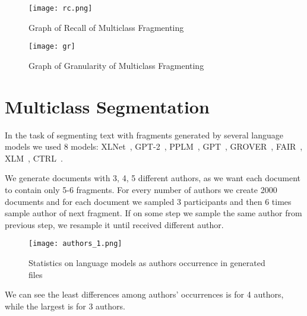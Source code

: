 \documentclass{article}
\begin{document}
\begin{figure}[bhtp]
	\texttt{[image: rc.png]}
	\caption{Graph of Recall of Multiclass Fragmenting}
	\label{fig:4}
\end{figure}

\begin{figure}[bhtp]
	\texttt{[image: gr]}
	\caption{Graph of Granularity of Multiclass Fragmenting}
	\label{fig:5}
\end{figure}




\clearpage



\newpage
\appendix
\section{Multiclass Segmentation}

In the task of segmenting text with fragments generated by several language models we used 8 models: XLNet~\cite{xlnet}, GPT-2~\cite{gpt2}, PPLM~\cite{pplm}, GPT~\cite{gpt}, GROVER~\cite{grover}, FAIR~\cite{FAIR}, XLM~\cite{xlm}, CTRL~\cite{ctrl}.

We generate  documents with 3, 4, 5 different authors, as we want each document to contain only 5-6 fragments. For every number of authors we create 2000 documents and for each document we sampled 3 participants and then 6 times sample author of next fragment. If on some step we sample the same author from previous step, we resample it until received different author. 

\begin{figure}[bhtp]
	\texttt{[image: authors\_1.png]}
	\caption{Statistics on language models as authors occurrence in generated files}
	\label{fig:6}
\end{figure}

We can see the least differences among authors' occurrences is for 4 authors, while the largest is for 3 authors.
\end{document}

